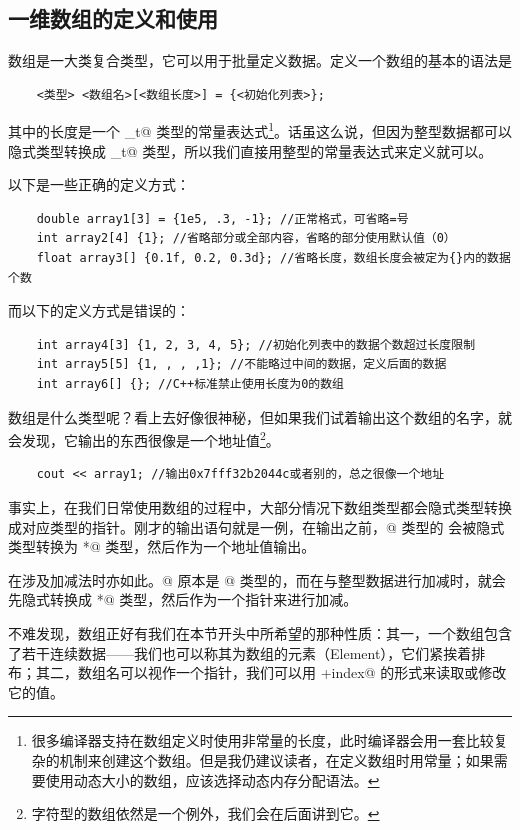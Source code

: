 \subsection*{一维数组的定义和使用}
数组是一大类复合类型，它可以用于批量定义数据。定义一个数组的基本的语法是
\begin{lstlisting}
    <类型> <数组名>[<数组长度>] = {<初始化列表>};
\end{lstlisting}
其中的长度是一个 \lstinline@size_t@ 类型的常量表达式\footnote{很多编译器支持在数组定义时使用非常量的长度，此时编译器会用一套比较复杂的机制来创建这个数组。但是我仍建议读者，在定义数组时用常量；如果需要使用动态大小的数组，应该选择动态内存分配语法。}。话虽这么说，但因为整型数据都可以隐式类型转换成 \lstinline@size_t@ 类型，所以我们直接用整型的常量表达式来定义就可以。\par
以下是一些正确的定义方式：
\begin{lstlisting}
    double array1[3] = {1e5, .3, -1}; //正常格式，可省略=号
    int array2[4] {1}; //省略部分或全部内容，省略的部分使用默认值（0）
    float array3[] {0.1f, 0.2, 0.3d}; //省略长度，数组长度会被定为{}内的数据个数
\end{lstlisting}
而以下的定义方式是错误的：
\begin{lstlisting}
    int array4[3] {1, 2, 3, 4, 5}; //初始化列表中的数据个数超过长度限制
    int array5[5] {1, , , ,1}; //不能略过中间的数据，定义后面的数据
    int array6[] {}; //C++标准禁止使用长度为0的数组
\end{lstlisting}
数组是什么类型呢？看上去好像很神秘，但如果我们试着输出这个数组的名字，就会发现，它输出的东西很像是一个地址值\footnote{字符型的数组依然是一个例外，我们会在后面讲到它。}。
\begin{lstlisting}
    cout << array1; //输出0x7fff32b2044c或者别的，总之很像一个地址
\end{lstlisting}\par
事实上，在我们日常使用数组的过程中，大部分情况下数组类型都会隐式类型转换成对应类型的指针。刚才的输出语句就是一例，在输出之前，\lstinline@double[3]@ 类型的 \lstinline@array@ 会被隐式类型转换为 \lstinline@double*@ 类型，然后作为一个地址值输出。\par
在涉及加减法时亦如此。@ 原本是 \lstinline@int[4]@ 类型的，而在与整型数据进行加减时，就会先隐式转换成 \lstinline@int*@ 类型，然后作为一个指针来进行加减。\par
不难发现，数组正好有我们在本节开头中所希望的那种性质：其一，一个数组包含了若干连续数据——我们也可以称其为数组的元素（Element），它们紧挨着排布；其二，数组名可以视作一个指针，我们可以用 \lstinline@p+index@ 的形式来读取或修改它的值。\par\pagebreak
